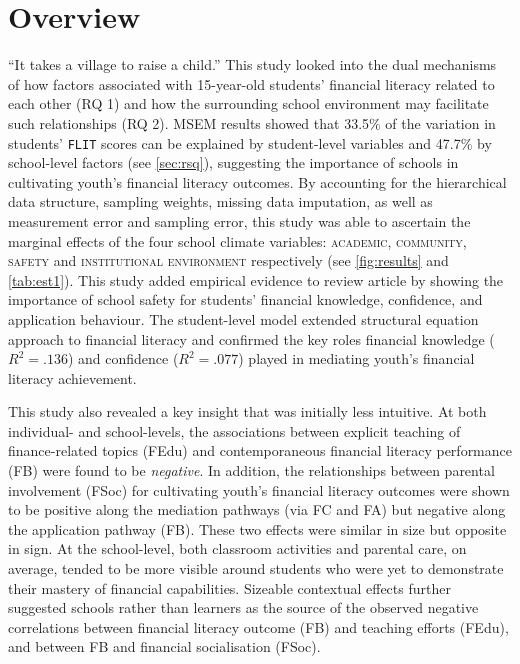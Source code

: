 \documentclass[a4paper,11pt,UKenglish,twoside,openright]{report}\usepackage[]{graphicx}\usepackage[]{color}
\begin{document}
\section{Overview}
``It takes a village to raise a child.'' This study looked into the dual mechanisms of how factors associated with 15-year-old students' financial literacy related to each other (RQ 1) and how the surrounding school environment may facilitate such relationships (RQ 2). MSEM results showed that 33.5\% of the variation in students' \texttt{FLIT} scores can be explained by student-level variables and 47.7\% by school-level factors (see \cref{sec:rsq}), suggesting the importance of schools in cultivating youth's financial literacy outcomes. By accounting for the hierarchical data structure, sampling weights, missing data imputation, as well as measurement error and sampling error, this study was able to ascertain the marginal effects of the four school climate variables: \textsc{academic}, \textsc{community}, \textsc{safety} and \textsc{institutional environment} \parencite{wang:2016} respectively (see \cref{fig:results} and \cref{tab:est1}). This study added empirical evidence to  review article by showing the importance of school safety for students' financial knowledge, confidence, and application behaviour. The student-level model extended  structural equation approach to financial literacy and confirmed the key roles financial knowledge ($R^2 = .136$) and confidence ($R^2 = .077$) played in mediating youth's financial literacy achievement.

This study also revealed a key insight that was initially less intuitive. At both individual- and school-levels, the associations between explicit teaching of finance-related topics (FEdu) and contemporaneous financial literacy performance (FB) were found to be \emph{negative}. In addition, the relationships between parental involvement (FSoc) for cultivating youth's financial literacy outcomes were shown to be positive along the mediation pathways (via FC and FA) but negative along the application pathway (FB). These two effects were similar in size but opposite in sign. At the school-level, both classroom activities and parental care, on average, tended to be more visible around students who were yet to demonstrate their mastery of financial capabilities. Sizeable contextual effects further suggested schools rather than learners as the source of the observed negative correlations between financial literacy outcome (FB) and teaching efforts (FEdu), and between FB and financial socialisation (FSoc).
\end{document}
